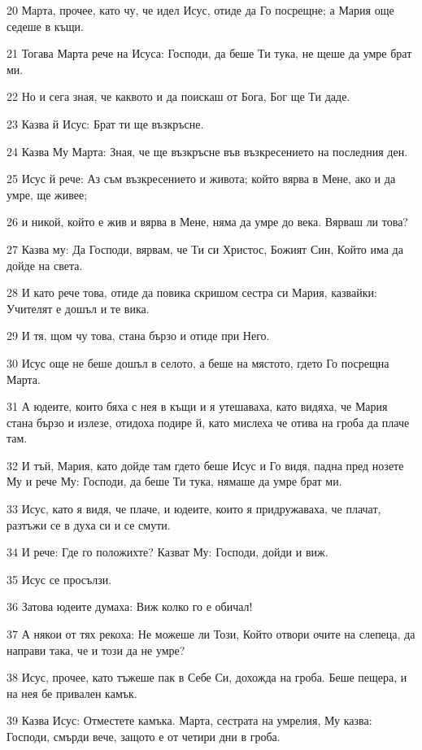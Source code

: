 \par 20 Марта, прочее, като чу, че идел Исус, отиде да Го посрещне; а Мария още седеше в къщи.
\par 21 Тогава Марта рече на Исуса: Господи, да беше Ти тука, не щеше да умре брат ми.
\par 22 Но и сега зная, че каквото и да поискаш от Бога, Бог ще Ти даде.
\par 23 Казва й Исус: Брат ти ще възкръсне.
\par 24 Казва Му Марта: Зная, че ще възкръсне във възкресението на последния ден.
\par 25 Исус й рече: Аз съм възкресението и живота; който вярва в Мене, ако и да умре, ще живее;
\par 26 и никой, който е жив и вярва в Мене, няма да умре до века. Вярваш ли това?
\par 27 Казва му: Да Господи, вярвам, че Ти си Христос, Божият Син, Който има да дойде на света.
\par 28 И като рече това, отиде да повика скришом сестра си Мария, казвайки: Учителят е дошъл и те вика.
\par 29 И тя, щом чу това, стана бързо и отиде при Него.
\par 30 Исус още не беше дошъл в селото, а беше на мястото, гдето Го посрещна Марта.
\par 31 А юдеите, които бяха с нея в къщи и я утешаваха, като видяха, че Мария стана бързо и излезе, отидоха подире й, като мислеха че отива на гроба да плаче там.
\par 32 И тъй, Мария, като дойде там гдето беше Исус и Го видя, падна пред нозете Му и рече Му: Господи, да беше Ти тука, нямаше да умре брат ми.
\par 33 Исус, като я видя, че плаче, и юдеите, които я придружаваха, че плачат, разтъжи се в духа си и се смути.
\par 34 И рече: Где го положихте? Казват Му: Господи, дойди и виж.
\par 35 Исус се просълзи.
\par 36 Затова юдеите думаха: Виж колко го е обичал!
\par 37 А някои от тях рекоха: Не можеше ли Този, Който отвори очите на слепеца, да направи така, че и този да не умре?
\par 38 Исус, прочее, като тъжеше пак в Себе Си, дохожда на гроба. Беше пещера, и на нея бе привален камък.
\par 39 Казва Исус: Отместете камъка. Марта, сестрата на умрелия, Му казва: Господи, смърди вече, защото е от четири дни в гроба.
